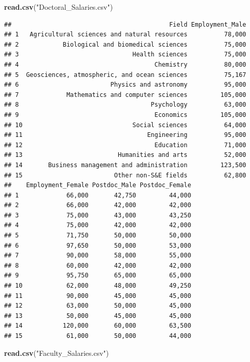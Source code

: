 \documentclass[]{article}
\newenvironment{Shaded}{\begin{snugshade}}{\end{snugshade}}
\newcommand{\KeywordTok}[1]{\textcolor[rgb]{0.13,0.29,0.53}{\textbf{#1}}}
\newcommand{\StringTok}[1]{\textcolor[rgb]{0.31,0.60,0.02}{#1}}
\newcommand{\NormalTok}[1]{#1}
\begin{document}
\begin{Shaded}
\begin{Highlighting}[]
\KeywordTok{read.csv}\NormalTok{(}\StringTok{"Doctoral_Salaries.csv"}\NormalTok{)}
\end{Highlighting}
\end{Shaded}

\begin{verbatim}
##                                           Field Employment_Male
## 1   Agricultural sciences and natural resources          78,000
## 2            Biological and biomedical sciences          75,000
## 3                               Health sciences          75,000
## 4                                     Chemistry          80,000
## 5  Geosciences, atmospheric, and ocean sciences          75,167
## 6                         Physics and astronomy          95,000
## 7             Mathematics and computer sciences         105,000
## 8                                    Psychology          63,000
## 9                                     Economics         105,000
## 10                              Social sciences          64,000
## 11                                  Engineering          95,000
## 12                                    Education          71,000
## 13                          Humanities and arts          52,000
## 14       Business management and administration         123,500
## 15                         Other non-S&E fields          62,800
##    Employment_Female Postdoc_Male Postdoc_Female
## 1             66,000       42,750         44,000
## 2             66,000       42,000         42,000
## 3             75,000       43,000         43,250
## 4             75,000       42,000         42,000
## 5             71,750       50,000         50,000
## 6             97,650       50,000         53,000
## 7             90,000       58,000         55,000
## 8             60,000       42,000         42,000
## 9             95,750       65,000         65,000
## 10            62,000       48,000         49,250
## 11            90,000       45,000         45,000
## 12            63,000       50,000         45,000
## 13            50,000       45,000         45,000
## 14           120,000       60,000         63,500
## 15            61,000       50,000         44,000
\end{verbatim}

\begin{Shaded}
\begin{Highlighting}[]
\KeywordTok{read.csv}\NormalTok{(}\StringTok{"Faculty_Salaries.csv"}\NormalTok{)}
\end{Highlighting}
\end{Shaded}
\end{document}
